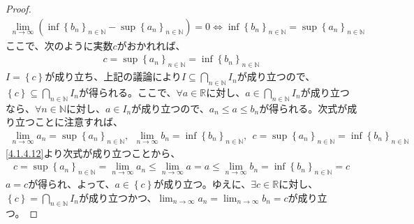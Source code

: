 \documentclass[dvipdfmx]{jsarticle}
\begin{document}
\begin{proof}
\begin{align*}
\lim_{n \rightarrow \infty}\left( {\inf\left\{ b_{n} \right\}}_{n \in \mathbb{N}} - {\sup\left\{ a_{n} \right\}}_{n \in \mathbb{N}} \right) = 0 \Leftrightarrow {\inf\left\{ b_{n} \right\}}_{n \in \mathbb{N}} = {\sup\left\{ a_{n} \right\}}_{n \in \mathbb{N}}
\end{align*}
ここで、次のように実数$c$がおかれれば、
\begin{align*}
c = {\sup\left\{ a_{n} \right\}}_{n \in \mathbb{N}} = {\inf\left\{ b_{n} \right\}}_{n \in \mathbb{N}}
\end{align*}
$I = \left\{ c \right\}$が成り立ち、上記の議論により$I \subseteq \bigcap_{n \in \mathbb{N}}I_{n}$が成り立つので、$\left\{ c \right\} \subseteq \bigcap_{n \in \mathbb{N}}I_{n}$が得られる。ここで、$\forall a \in \mathbb{R}$に対し、$a \in \bigcap_{n \in \mathbb{N}}I_{n}$が成り立つなら、$\forall n \in \mathbb{N}$に対し、$a \in I_{n}$が成り立つので、$a_{n} \leq a \leq b_{n}$が得られる。次式が成り立つことに注意すれば、
\begin{align*}
\lim_{n \rightarrow \infty}a_{n} = {\sup\left\{ a_{n} \right\}}_{n \in \mathbb{N}},\ \ \lim_{n \rightarrow \infty}b_{n} = {\inf\left\{ b_{n} \right\}}_{n \in \mathbb{N}},\ \ c = {\sup\left\{ a_{n} \right\}}_{n \in \mathbb{N}} = {\inf\left\{ b_{n} \right\}}_{n \in \mathbb{N}}
\end{align*}
\ref{4.1.4.12}より次式が成り立つことから、
\begin{align*}
c = {\sup\left\{ a_{n} \right\}}_{n \in \mathbb{N}} = \lim_{n \rightarrow \infty}a_{n} \leq \lim_{n \rightarrow \infty}a = a \leq \lim_{n \rightarrow \infty}b_{n} = {\inf\left\{ b_{n} \right\}}_{n \in \mathbb{N}} = c
\end{align*}
$a = c$が得られ、よって、$a \in \left\{ c \right\}$が成り立つ。ゆえに、$\exists c \in \mathbb{R}$に対し、$\left\{ c \right\} = \bigcap_{n \in \mathbb{N}}I_{n}$が成り立つかつ、$\lim_{n \rightarrow \infty}a_{n} = \lim_{n \rightarrow \infty}b_{n} = c$が成り立つ。
\end{proof}
\end{document}
